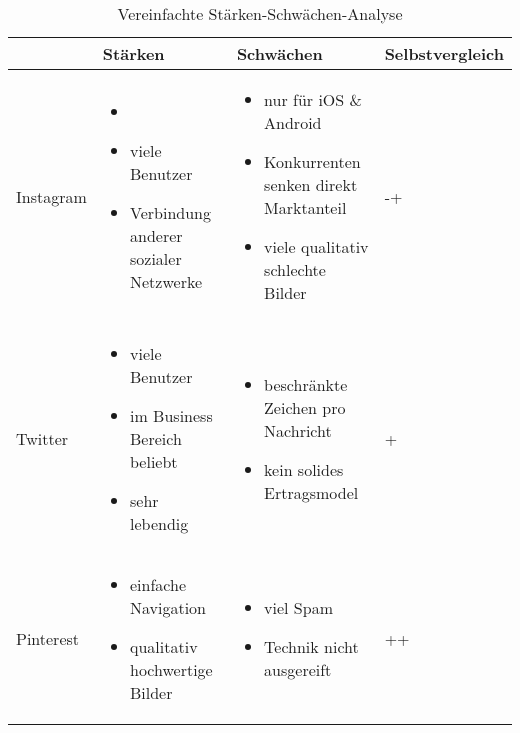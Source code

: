 
\begin{center}
	\begin{table}[htbp!]
	\centering
		\begin{tabular}{| M{2cm} | M{5cm} | M{5cm} | M{3cm} |}
		\hline
			\textbf{ } & \textbf{Stärken} & \textbf{Schwächen} & \textbf{Selbstvergleich} \\ \hline
			Instagram 
			& \begin{itemize}
				\item[]
				\item viele Benutzer
				\item Verbindung anderer sozialer Netzwerke
			\end{itemize}
			& \begin{itemize}
				\item nur für iOS \& Android
				\item Konkurrenten senken direkt Marktanteil
				\item viele qualitativ schlechte Bilder
			\end{itemize} 
			& -+
			\\ \hline
			
			Twitter 
			& \begin{itemize}
				\item viele Benutzer
				\item im Business Bereich beliebt
				\item sehr lebendig
			\end{itemize}
			& \begin{itemize}
				\item beschränkte Zeichen pro Nachricht
				\item kein solides Ertragsmodel
			\end{itemize} 
			& +
			\\ \hline
			
			Pinterest 
			& \begin{itemize}
				\item einfache Navigation
				\item qualitativ hochwertige Bilder
			\end{itemize}
			& \begin{itemize}
				\item viel Spam
				\item Technik nicht ausgereift
			\end{itemize} 
			& ++
			\\ \hline
		\end{tabular}
		\caption{Vereinfachte Stärken-Schwächen-Analyse}
		\label{table:simpleSwot}
	\end{table}
\end{center}
